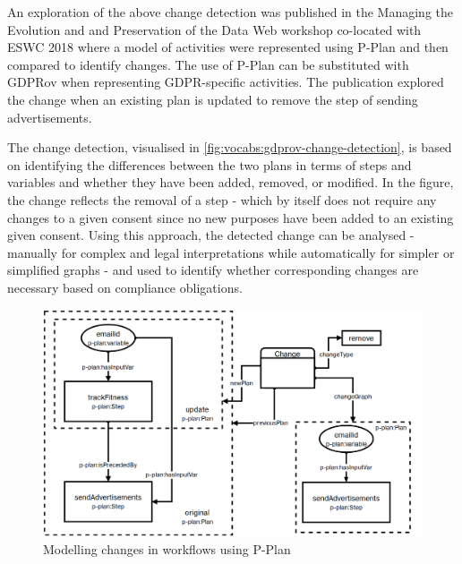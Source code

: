 An exploration of the above change detection was published in the Managing the Evolution and and Preservation of the Data Web workshop co-located with ESWC 2018 \cite{pandit_gdpr-driven_2018} where a model of activities were represented using P-Plan and then compared to identify changes. The use of P-Plan can be substituted with GDPRov when representing GDPR-specific activities.
The publication explored the change when an existing plan is updated to remove the step of sending advertisements. 

The change detection, visualised in \autoref{fig:vocabs:gdprov-change-detection}, is based on identifying the differences between the two plans in terms of steps and variables and whether they have been added, removed, or modified.
In the figure, the change reflects the removal of a step - which by itself does not require any changes to a given consent since no new purposes have been added to an existing given consent.
Using this approach, the detected change can be analysed - manually for complex and legal interpretations while automatically for simpler or simplified graphs - and used to identify whether corresponding changes are necessary based on compliance obligations.
\begin{figure}[htbp]
    \centering
    \includegraphics[width=\textwidth]{img/GDPRov-change-detection.png}
    \caption{Modelling changes in workflows using P-Plan \cite{pandit_gdpr-driven_2018}}
    \label{fig:vocabs:gdprov-change-detection}
\end{figure}

